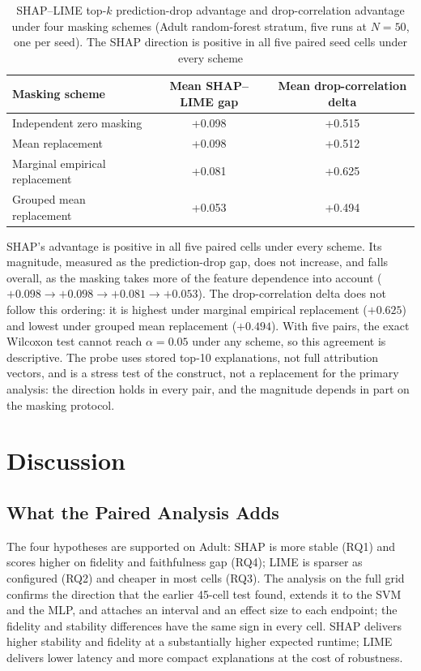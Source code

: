 \documentclass[11pt,a4paper]{article}
\begin{document}
\begin{table}[htb]
\centering
\caption{SHAP--LIME top-$k$ prediction-drop advantage and drop-correlation
advantage under four masking schemes (Adult random-forest stratum, five
runs at $N=50$, one per seed). The SHAP direction is positive in all five
paired seed cells under every scheme}
\label{tab:masking}
\begin{tabular}{lcc}
\toprule
Masking scheme & Mean SHAP--LIME gap & Mean drop-correlation delta \\
\midrule
Independent zero masking      & +0.098 & +0.515 \\
Mean replacement               & +0.098 & +0.512 \\
Marginal empirical replacement & +0.081 & +0.625 \\
Grouped mean replacement       & +0.053 & +0.494 \\
\bottomrule
\end{tabular}
\end{table}

SHAP's advantage is positive in all five paired cells under every scheme.
Its magnitude, measured as the prediction-drop gap, does not increase, and
falls overall, as the masking takes more of the feature dependence into
account ($+0.098 \rightarrow +0.098 \rightarrow +0.081 \rightarrow
+0.053$). The drop-correlation delta does not follow this ordering: it is
highest under marginal empirical replacement ($+0.625$) and lowest under
grouped mean replacement ($+0.494$). With five pairs, the exact Wilcoxon
test cannot reach $\alpha = 0.05$ under any scheme, so this agreement is
descriptive. The probe uses stored top-10 explanations, not full
attribution vectors, and is a stress test of the construct, not a
replacement for the primary analysis: the direction holds in every pair,
and the magnitude depends in part on the masking protocol.

\section{Discussion}
\label{sec:discussion}

\subsection{What the Paired Analysis Adds}

The four hypotheses are supported on Adult: SHAP is more stable (RQ1) and
scores higher on fidelity and faithfulness gap (RQ4); LIME is sparser as
configured (RQ2) and cheaper in most cells (RQ3). The analysis on the full
grid confirms the direction that the earlier 45-cell test found, extends it
to the SVM and the MLP, and attaches an interval and an effect size to each
endpoint; the fidelity and stability differences have the same sign in
every cell.
SHAP delivers higher stability and fidelity at a substantially higher
expected runtime; LIME delivers lower latency and more compact explanations
at the cost of robustness.
\end{document}
